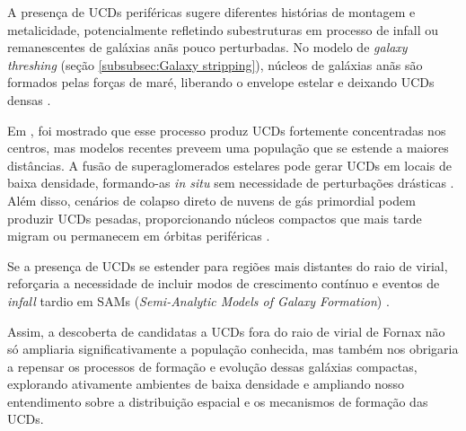 A presença de UCDs periféricas sugere diferentes histórias de montagem e metalicidade, potencialmente refletindo subestruturas em processo de infall ou remanescentes de galáxias anãs pouco perturbadas. No modelo de \textit{galaxy threshing} (seção \ref{subsubsec:Galaxy stripping}), núcleos de galáxias anãs são formados pelas forças de maré, liberando o envelope estelar e deixando UCDs densas \citep{Thomas_2008}.

Em \cite{Bekki_2001}, foi mostrado que esse processo produz UCDs fortemente concentradas nos centros, mas modelos recentes preveem uma população que se estende a maiores distâncias. A fusão de superaglomerados estelares pode gerar UCDs em locais de baixa densidade, formando-as \textit{in situ} sem necessidade de perturbações drásticas \citep{Mieske_2011}. Além disso, cenários de colapso direto de nuvens de gás primordial podem produzir UCDs pesadas, proporcionando núcleos compactos que mais tarde migram ou permanecem em órbitas periféricas \citep{Drinkwater_2003}.

Se a presença de UCDs se estender para regiões mais distantes do raio de virial, reforçaria a necessidade de incluir modos de crescimento contínuo e eventos de \textit{infall} tardio em SAMs (\textit{Semi-Analytic Models of Galaxy Formation}) \citep{Pfeffer_2016}.

Assim, a descoberta de candidatas a UCDs fora do raio de virial de Fornax não só ampliaria significativamente a população conhecida, mas também nos obrigaria a repensar os processos de formação e evolução dessas galáxias compactas, explorando ativamente ambientes de baixa densidade e ampliando nosso entendimento sobre a distribuição espacial e os mecanismos de formação das UCDs.


